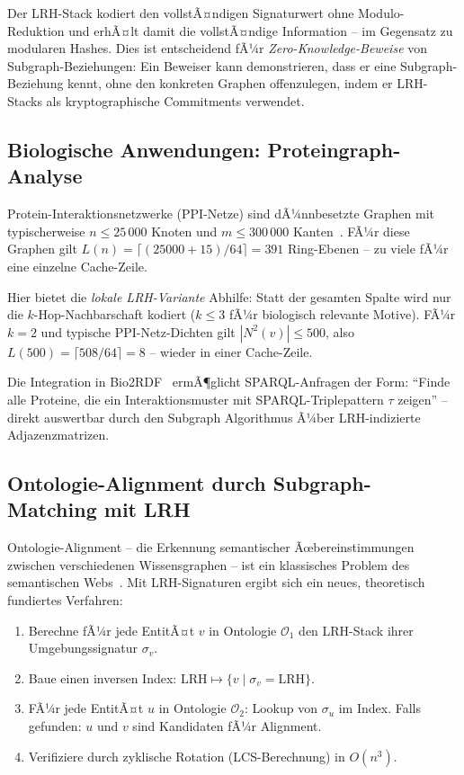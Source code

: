 ﻿\documentclass[a4paper,12pt]{article}
\theoremstyle{definition}
\begin{document}
Der LRH-Stack kodiert den vollstÃ¤ndigen Signaturwert ohne Modulo-Reduktion und
erhÃ¤lt damit die vollstÃ¤ndige Information -- im Gegensatz zu modularen Hashes.
Dies ist entscheidend fÃ¼r \emph{Zero-Knowledge-Beweise} von Subgraph-Beziehungen:
Ein Beweiser kann demonstrieren, dass er eine Subgraph-Beziehung kennt, ohne den
konkreten Graphen offenzulegen, indem er LRH-Stacks als kryptographische Commitments
verwendet.

\subsection{Biologische Anwendungen: Proteingraph-Analyse}

Protein-Interaktionsnetzwerke (PPI-Netze) sind dÃ¼nnbesetzte Graphen mit typischerweise
$n \leq 25\,000$ Knoten und $m \leq 300\,000$ Kanten~\cite{sharan2006}. FÃ¼r diese
Graphen gilt $L(n) = \lceil (25000 + 15) / 64 \rceil = 391$ Ring-Ebenen -- zu viele
fÃ¼r eine einzelne Cache-Zeile.

Hier bietet die \emph{lokale LRH-Variante} Abhilfe: Statt der gesamten Spalte
wird nur die $k$-Hop-Nachbarschaft kodiert ($k \leq 3$ fÃ¼r biologisch relevante
Motive). FÃ¼r $k=2$ und typische PPI-Netz-Dichten gilt $|N^2(v)| \leq 500$, also
$L(500) = \lceil 508/64 \rceil = 8$ -- wieder in einer Cache-Zeile.

Die Integration in Bio2RDF~\cite{belleau2008} ermÃ¶glicht SPARQL-Anfragen der Form:
``Finde alle Proteine, die ein Interaktionsmuster mit SPARQL-Triplepattern $\tau$
zeigen'' -- direkt auswertbar durch den Subgraph Algorithmus Ã¼ber LRH-indizierte
Adjazenzmatrizen.

\subsection{Ontologie-Alignment durch Subgraph-Matching mit LRH}

Ontologie-Alignment -- die Erkennung semantischer Ãœbereinstimmungen zwischen
verschiedenen Wissensgraphen -- ist ein klassisches Problem des semantischen
Webs~\cite{euzenat2007}. Mit LRH-Signaturen ergibt sich ein neues, theoretisch
fundiertes Verfahren:

\begin{enumerate}
  \item Berechne fÃ¼r jede EntitÃ¤t $v$ in Ontologie $\mathcal{O}_1$ den
        LRH-Stack ihrer Umgebungssignatur $\sigma_v$.
  \item Baue einen inversen Index: $\mathrm{LRH} \mapsto \{v \mid \sigma_v = \mathrm{LRH}\}$.
  \item FÃ¼r jede EntitÃ¤t $u$ in Ontologie $\mathcal{O}_2$: Lookup von $\sigma_u$ im Index.
        Falls gefunden: $u$ und $v$ sind Kandidaten fÃ¼r Alignment.
  \item Verifiziere durch zyklische Rotation (LCS-Berechnung) in $O(n^3)$.
\end{enumerate}
\end{document}
